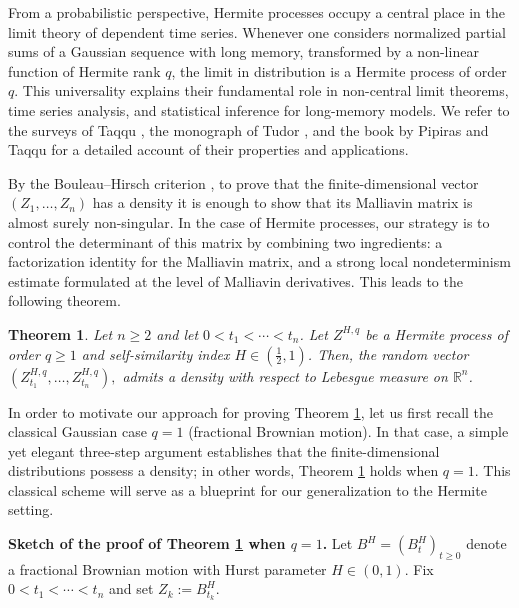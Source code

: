 \documentclass[a4paper,10pt]{article}
\theoremstyle{definition}
\theoremstyle{plain}
\newtheorem{thm}[Def]{Theorem}
\newcommand{\R}{\mathbb{R}}
\newcommand\1{\mathbbm{1}}
\begin{document}
 \medskip

From a probabilistic perspective, Hermite processes occupy a central place in the limit theory of dependent time series. Whenever one considers normalized partial sums of a Gaussian sequence with long memory, transformed by a non-linear function of Hermite rank $q$, the limit in distribution is a Hermite process of order $q$. This universality explains their fundamental role in non-central limit theorems, time series analysis, and statistical inference for long-memory models. We refer to the surveys of Taqqu \cite{Taqqu03}, the monograph of Tudor \cite{Tudor23}, and the book by Pipiras and Taqqu \cite{PipirasTaqqu17} for a detailed account of their properties and applications.

\medskip

By the Bouleau--Hirsch criterion \cite{BouleauHirsch1984}, to prove that the finite-dimensional vector \((Z_1,\dots,Z_n)\) has a density it is enough to show that its Malliavin matrix is almost surely non-singular. In the case of Hermite processes, our strategy is to control the determinant of this matrix by combining two ingredients: a  factorization identity for the Malliavin matrix, and a strong local nondeterminism estimate formulated at the level of Malliavin derivatives. This leads to the following theorem.



\begin{thm}\label{thm1}
Let $n\ge 2$ and let $0<t_1<\cdots<t_n$. 
 Let $Z^{H,q}$ be a Hermite process of order $q\ge 1$ and self-similarity index $H\in(\frac12,1)$.
Then, the random vector
$
(Z^{H,q}_{t_1},\dots,Z^{H,q}_{t_n}),
$
admits a density with respect to Lebesgue measure on $\R^n$. 
\end{thm}



In order to motivate our approach for proving Theorem \ref{thm1}, let us first recall the classical Gaussian case $q=1$ (fractional Brownian motion). 
In that case, a simple yet elegant three-step argument establishes that the finite-dimensional distributions possess a density; in other words, Theorem \ref{thm1} holds when $q=1$.
This classical scheme will serve as a blueprint for our generalization to the Hermite setting.

\medskip
\noindent\textbf{Sketch of the proof of Theorem \ref{thm1} when $q=1$.}
Let $B^H=(B^H_t)_{t\ge0}$ denote a fractional Brownian motion with Hurst parameter $H\in(0,1)$. 
Fix $0<t_1<\cdots<t_n$ and set $Z_k:=B^H_{t_k}$.  
\end{document}
